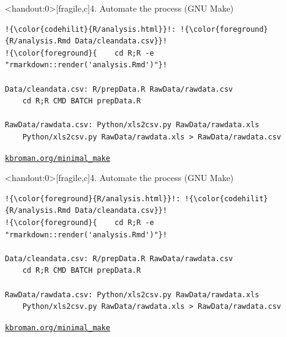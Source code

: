 \documentclass[12pt,t]{beamer}
\begin{document}
\begin{frame}<handout:0>[fragile,c]{4. Automate the process (GNU Make)}

\addtocounter{framenumber}{-1}

\vspace{15mm}

\begin{center}
\begin{minipage}[c]{10.8cm}
\begin{semiverbatim}
\begin{lstlisting}[escapechar=!,linewidth=10.8cm]
!{\color{codehilit}{R/analysis.html}}!: !{\color{foreground}{R/analysis.Rmd Data/cleandata.csv}}!
!{\color{foreground}{    cd R;R -e "rmarkdown::render('analysis.Rmd')"}!

Data/cleandata.csv: R/prepData.R RawData/rawdata.csv
    cd R;R CMD BATCH prepData.R

RawData/rawdata.csv: Python/xls2csv.py RawData/rawdata.xls
    Python/xls2csv.py RawData/rawdata.xls > RawData/rawdata.csv
\end{lstlisting}
\end{semiverbatim}
\end{minipage}
\end{center}


\vspace{15mm}

\hfill
{\footnotesize \lolit
\href{http://kbroman.org/minimal_make}{\tt kbroman.org/minimal\_make}
}

\end{frame}



\begin{frame}<handout:0>[fragile,c]{4. Automate the process (GNU Make)}

\addtocounter{framenumber}{-1}

\vspace{15mm}

\begin{center}
\begin{minipage}[c]{10.8cm}
\begin{semiverbatim}
\begin{lstlisting}[escapechar=!,linewidth=10.8cm]
!{\color{foreground}{R/analysis.html}}!: !{\color{codehilit}{R/analysis.Rmd Data/cleandata.csv}}!
!{\color{foreground}{    cd R;R -e "rmarkdown::render('analysis.Rmd')"}!

Data/cleandata.csv: R/prepData.R RawData/rawdata.csv
    cd R;R CMD BATCH prepData.R

RawData/rawdata.csv: Python/xls2csv.py RawData/rawdata.xls
    Python/xls2csv.py RawData/rawdata.xls > RawData/rawdata.csv
\end{lstlisting}
\end{semiverbatim}
\end{minipage}
\end{center}

\vspace{15mm}

\hfill
{\footnotesize \lolit
\href{http://kbroman.org/minimal_make}{\tt kbroman.org/minimal\_make}
}

\end{frame}
\end{document}
